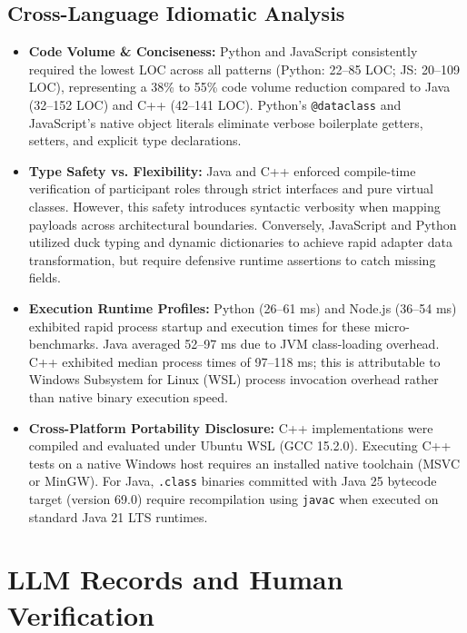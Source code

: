 \documentclass[11pt,a4paper]{article}
\begin{document}
\subsection{Cross-Language Idiomatic Analysis}
\begin{itemize}
\item \textbf{Code Volume \& Conciseness:} Python and JavaScript consistently required the lowest LOC across all patterns (Python: 22--85 LOC; JS: 20--109 LOC), representing a 38\% to 55\% code volume reduction compared to Java (32--152 LOC) and C++ (42--141 LOC). Python's \texttt{@dataclass} and JavaScript's native object literals eliminate verbose boilerplate getters, setters, and explicit type declarations.
\item \textbf{Type Safety vs. Flexibility:} Java and C++ enforced compile-time verification of participant roles through strict interfaces and pure virtual classes. However, this safety introduces syntactic verbosity when mapping payloads across architectural boundaries. Conversely, JavaScript and Python utilized duck typing and dynamic dictionaries to achieve rapid adapter data transformation, but require defensive runtime assertions to catch missing fields.
\item \textbf{Execution Runtime Profiles:} Python (26--61 ms) and Node.js (36--54 ms) exhibited rapid process startup and execution times for these micro-benchmarks. Java averaged 52--97 ms due to JVM class-loading overhead. C++ exhibited median process times of 97--118 ms; this is attributable to Windows Subsystem for Linux (WSL) process invocation overhead rather than native binary execution speed.
\item \textbf{Cross-Platform Portability Disclosure:} C++ implementations were compiled and evaluated under Ubuntu WSL (GCC 15.2.0). Executing C++ tests on a native Windows host requires an installed native toolchain (MSVC or MinGW). For Java, \texttt{.class} binaries committed with Java 25 bytecode target (version 69.0) require recompilation using \texttt{javac} when executed on standard Java 21 LTS runtimes.
\end{itemize}

\section{LLM Records and Human Verification}
\end{document}
